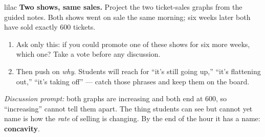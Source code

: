 \documentclass[10pt]{article}
\begin{document}
\begin{skillbox}[Hook]{lilac}
    \textbf{Two shows, same sales.} Project the two ticket-sales graphs from
    the guided notes. Both shows went on sale the same morning; six weeks
    later both have sold exactly 600 tickets.
    \begin{enumerate}[itemsep=2pt]
        \item Ask only this: if you could promote one of these shows for six
              more weeks, which one? Take a vote before any discussion.
        \item Then push on \textit{why}. Students will reach for ``it's still
              going up,'' ``it's flattening out,'' ``it's taking off'' ---
              catch those phrases and keep them on the board.
    \end{enumerate}
    \textit{Discussion prompt:} both graphs are increasing and both end at
    600, so ``increasing'' cannot tell them apart. The thing students can see
    but cannot yet name is how the \textit{rate} of selling is changing. By
    the end of the hour it has a name: \textbf{concavity}.
\end{skillbox}
\end{document}
